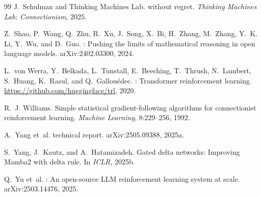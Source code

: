 \documentclass[11pt,a4paper,fontset=none]{ctexart}
\begin{document}
\begin{thebibliography}{99}
J.~Schulman and Thinking Machines Lab.
 without regret.
\newblock \emph{Thinking Machines Lab: Connectionism}, 2025.

Z.~Shao, P.~Wang, Q.~Zhu, R.~Xu, J.~Song, X.~Bi, H.~Zhang, M.~Zhang,
Y.~K. Li, Y.~Wu, and D.~Guo.
: Pushing the limits of mathematical reasoning in open
language models.
\newblock arXiv:2402.03300, 2024.

L.~von Werra, Y.~Belkada, L.~Tunstall, E.~Beeching, T.~Thrush, N.~Lambert,
S.~Huang, K.~Rasul, and Q.~Gallou{\'e}dec.
: Transformer reinforcement learning.
\newblock \url{https://github.com/huggingface/trl}, 2020.

R.~J. Williams.
\newblock Simple statistical gradient-following algorithms for connectionist
reinforcement learning.
\newblock \emph{Machine Learning}, 8:229--256, 1992.

A.~Yang et~al.
 technical report.
\newblock arXiv:2505.09388, 2025a.

S.~Yang, J.~Kautz, and A.~Hatamizadeh.
\newblock Gated delta networks: Improving {Mamba2} with delta rule.
\newblock In \emph{ICLR}, 2025b.

Q.~Yu et~al.
: An open-source {LLM} reinforcement learning system at
scale.
\newblock arXiv:2503.14476, 2025.

\end{thebibliography}
\end{document}

